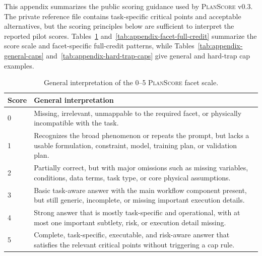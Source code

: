 \documentclass[11pt]{article}
\newcommand{\planscore}{\textsc{PlanScore}}
\begin{document}
This appendix summarizes the public scoring guidance used by \planscore{} v0.3. The private reference file contains task-specific critical points and acceptable alternatives, but the scoring principles below are sufficient to interpret the reported pilot scores. Tables~\ref{tab:appendix-score-scale} and~\ref{tab:appendix-facet-full-credit} summarize the score scale and facet-specific full-credit patterns, while Tables~\ref{tab:appendix-general-caps} and~\ref{tab:appendix-hard-trap-caps} give general and hard-trap cap examples.

\begin{table}[t]
\caption{General interpretation of the 0--5 \planscore{} facet scale.}
\label{tab:appendix-score-scale}
\centering
\small
\begin{tabularx}{\textwidth}{@{}p{}X@{}}
\toprule
\textbf{Score} & \textbf{General interpretation} \\
\midrule
0 & Missing, irrelevant, unmappable to the required facet, or physically incompatible with the task. \\
1 & Recognizes the broad phenomenon or repeats the prompt, but lacks a usable formulation, constraint, model, training plan, or validation plan. \\
2 & Partially correct, but with major omissions such as missing variables, conditions, data terms, task type, or core physical assumptions. \\
3 & Basic task-aware answer with the main workflow component present, but still generic, incomplete, or missing important execution details. \\
4 & Strong answer that is mostly task-specific and operational, with at most one important subtlety, risk, or execution detail missing. \\
5 & Complete, task-specific, executable, and risk-aware answer that satisfies the relevant critical points without triggering a cap rule. \\
\bottomrule
\end{tabularx}
\end{table}
\end{document}
